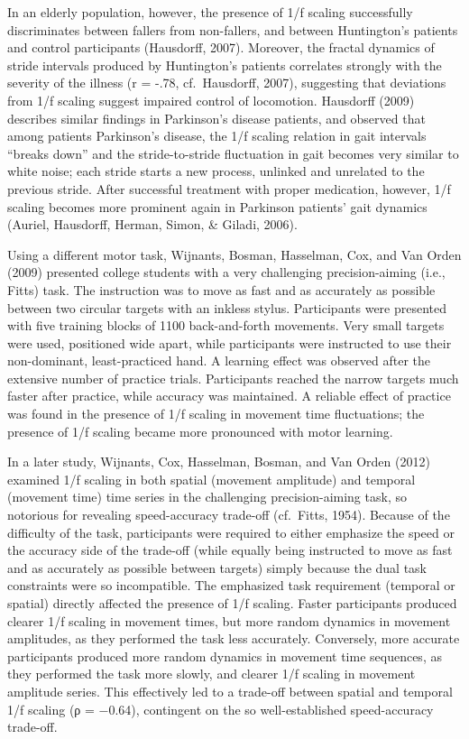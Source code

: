 \documentclass[12pt,]{book}
\begin{document}
In an elderly population, however, the presence of 1/f scaling successfully discriminates between fallers from non-fallers, and between Huntington's patients and control participants (Hausdorff, 2007). Moreover, the fractal dynamics of stride intervals produced by Huntington's patients correlates strongly with the severity of the illness (r = -.78, cf.~Hausdorff, 2007), suggesting that deviations from 1/f scaling suggest impaired control of locomotion. Hausdorff (2009) describes similar findings in Parkinson's disease patients, and observed that among patients Parkinson's disease, the 1/f scaling relation in gait intervals ``breaks down'' and the stride-to-stride fluctuation in gait becomes very similar to white noise; each stride starts a new process, unlinked and unrelated to the previous stride. After successful treatment with proper medication, however, 1/f scaling becomes more prominent again in Parkinson patients' gait dynamics (Auriel, Hausdorff, Herman, Simon, \& Giladi, 2006).

Using a different motor task, Wijnants, Bosman, Hasselman, Cox, and Van Orden (2009) presented college students with a very challenging precision-aiming (i.e., Fitts) task. The instruction was to move as fast and as accurately as possible between two circular targets with an inkless stylus. Participants were presented with five training blocks of 1100 back-and-forth movements. Very small targets were used, positioned wide apart, while participants were instructed to use their non-dominant, least-practiced hand. A learning effect was observed after the extensive number of practice trials. Participants reached the narrow targets much faster after practice, while accuracy was maintained. A reliable effect of practice was found in the presence of 1/f scaling in movement time fluctuations; the presence of 1/f scaling became more pronounced with motor learning.

In a later study, Wijnants, Cox, Hasselman, Bosman, and Van Orden (2012) examined 1/f scaling in both spatial (movement amplitude) and temporal (movement time) time series in the challenging precision-aiming task, so notorious for revealing speed-accuracy trade-off (cf.~Fitts, 1954). Because of the difficulty of the task, participants were required to either emphasize the speed or the accuracy side of the trade-off (while equally being instructed to move as fast and as accurately as possible between targets) simply because the dual task constraints were so incompatible. The emphasized task requirement (temporal or spatial) directly affected the presence of 1/f scaling. Faster participants produced clearer 1/f scaling in movement times, but more random dynamics in movement amplitudes, as they performed the task less accurately. Conversely, more accurate participants produced more random dynamics in movement time sequences, as they performed the task more slowly, and clearer 1/f scaling in movement amplitude series. This effectively led to a trade-off between spatial and temporal 1/f scaling (ρ = −0.64), contingent on the so well-established speed-accuracy trade-off.
\end{document}
